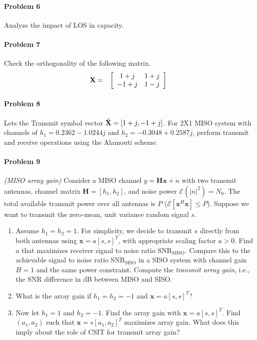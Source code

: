 \documentclass[12pt]{article}
\begin{document}
\paragraph{Problem 6} 
Analyze the impact of LOS in capacity.
\paragraph{Problem 7} 
Check the orthogonality of the following matrix.
\begin{eqnarray*}
{\bf X} &=& \left[
\begin{array}{cccc}
1+j & 1+j \\
-1+j & 1-j
\end{array}
\right]
\end{eqnarray*}
\paragraph{Problem 8} 
Lets the Transmit symbol vector $\tilde{{\bf X}} = [1 + j,-1 + j]$. For 2X1 MISO system with channels of $h_1=0.2362 - 1.0244j$ and $h_2=-0.3048 + 0.2587j$, perform transmit and receive operations using the Alamouti scheme.

\paragraph{Problem 9} {\it (MISO array gain)} \quad
Consider a MISO channel $ y = \mathbf H \mathbf x + n$ with two transmit antennas, channel matrix $\mathbf H = [h_1,h_2]$, and noise power $\mathcal E(\lvert n \rvert^2)=N_0$. The total available transmit power over all antennas is $P$ ($\mathcal E[\mathbf x^H \mathbf x]\leq P$).  Suppose we want to transmit the zero-mean, unit variance random signal $s$. 
\begin{enumerate}
\item Assume $h_1=h_2=1$. For simplicity, we decide to transmit $s$ directly from both antennas using $\mathbf x = a [s,s]^T$, with appropriate scaling factor $a>0$. Find $a$ that maximizes receiver signal to noise ratio $\mathrm{SNR}_\text{MISO}$. Compare this to the achievable signal to noise ratio $\mathrm{SNR}_\text{SISO}$ in a SISO system with channel gain $H=1$ and the same power constraint. Compute the \emph{transmit array gain}, i.e., the SNR difference in dB between MISO and SISO.
\item What is the array gain if $h_1=h_2=-1$ and $\mathbf x = a [s,s]^T$?
\item Now let $h_1=1$ and $h_2=-1$. Find the array gain with $\mathbf x = a [s,s]^T$. Find $(a_1,a_2)$ such that $\mathbf x = s[a_1,a_2]^T$ maximizes array gain. What does this imply about the role of CSIT for transmit array gain?
\end{enumerate}
\end{document}
